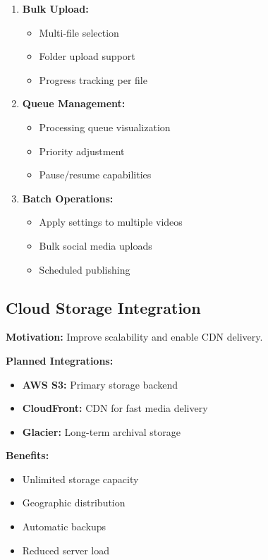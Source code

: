 \begin{enumerate}
    \item \textbf{Bulk Upload:}
    \begin{itemize}
        \item Multi-file selection
        \item Folder upload support
        \item Progress tracking per file
    \end{itemize}
    
    \item \textbf{Queue Management:}
    \begin{itemize}
        \item Processing queue visualization
        \item Priority adjustment
        \item Pause/resume capabilities
    \end{itemize}
    
    \item \textbf{Batch Operations:}
    \begin{itemize}
        \item Apply settings to multiple videos
        \item Bulk social media uploads
        \item Scheduled publishing
    \end{itemize}
\end{enumerate}

\subsection{Cloud Storage Integration}

\textbf{Motivation:} Improve scalability and enable CDN delivery.

\textbf{Planned Integrations:}

\begin{itemize}
    \item \textbf{AWS S3:} Primary storage backend
    \item \textbf{CloudFront:} CDN for fast media delivery
    \item \textbf{Glacier:} Long-term archival storage
\end{itemize}

\textbf{Benefits:}
\begin{itemize}
    \item Unlimited storage capacity
    \item Geographic distribution
    \item Automatic backups
    \item Reduced server load
\end{itemize}


